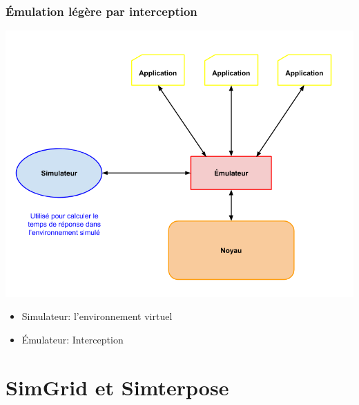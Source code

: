 \documentclass[10.5pt]{beamer}
\begin{document}
\begin{frame}{\subsecname}
  \frametitle{Émulation légère par interception}
  \begin{center}
    \includegraphics[scale=0.2]{Pictures/png/Virtualisation_interception}

    \vspace{0.5cm}
  \begin{minipage}{7cm}
  \begin{itemize}
  \item Simulateur: l'environnement virtuel
  \item Émulateur: Interception
  \end{itemize}
  \end{minipage}
  \end{center}
\end{frame}
\section{SimGrid et Simterpose}
\end{document}
